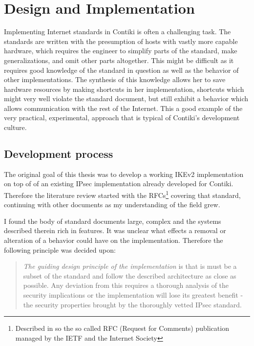 \documentclass[final,a4paper,twoside,11pt,onecolumn]{report}
\begin{document}
\chapter{Design and Implementation}
\label{cha:doi}
Implementing Internet standards in Contiki is often a challenging task. The standards are written with the presumption of hosts with vastly more capable hardware, which requires the engineer to simplify parts of the standard, make generalizations, and omit other parts altogether. This might be difficult as it requires good knowledge of the standard in question as well as the behavior of other implementations. The synthesis of this knowledge allows her to save hardware resources by making shortcuts in her implementation, shortcuts which might very well violate the standard document, but still exhibit a behavior which allows communication with the rest of the Internet. This a good example of the very practical, experimental, approach that is typical of Contiki's development culture.


\section{Development process}
The original goal of this thesis was to develop a working IKEv2 implementation on top of of an existing IPsec implementation already developed for Contiki. Therefore the literature review started with the RFCs\footnote{Described in so the so called RFC (Request for Comments) publication managed by the IETF and the Internet Society} covering that standard, continuing with other documents as my understanding of the field grew. 


I found the body of standard documents large, complex and the systems described therein rich in features. It was unclear what effects a removal or alteration of a behavior could have on the implementation. Therefore the following principle was decided upon:

\begin{quotation}
\emph{The guiding design principle of the implementation} is that is must be a subset of the standard and follow the described architecture as close as possible. Any deviation from this requires a thorough analysis of the security implications or the implementation will lose its greatest benefit - the security properties brought by the thoroughly vetted IPsec standard.
\end{quotation}
\end{document}
